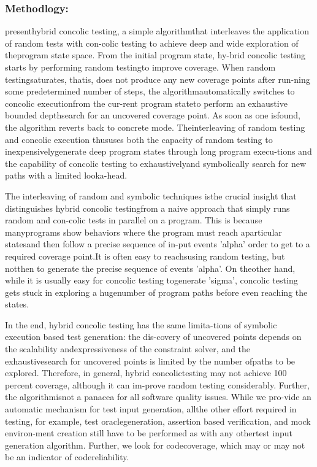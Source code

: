 \documentclass[	runningheads,
				a4paper]{llncs}
\begin{document}
\subsubsection{Methodlogy:}
presenthybrid concolic testing, a simple algorithmthat  interleaves  the  application  of  random  tests  with  con-colic  testing  to  achieve  deep  and  wide  exploration  of  theprogram  state  space.   From  the  initial  program  state,  hy-brid  concolic  testing  starts  by  performing  random  testingto improve coverage.  When random testingsaturates, thatis,  does  not  produce  any  new  coverage  points  after  run-ning  some  predetermined  number  of  steps,  the  algorithmautomatically switches to concolic executionfrom the cur-rent program stateto perform an exhaustive bounded depthsearch for an uncovered coverage point.  As soon as one isfound,  the algorithm reverts back to concrete mode.   Theinterleaving of random testing and concolic execution thususes both the capacity of random testing to inexpensivelygenerate deep program states through long program execu-tions and the capability of concolic testing to exhaustivelyand symbolically search for new paths with a limited looka-head.

The interleaving of random and symbolic techniques isthe crucial insight that distinguishes hybrid concolic testingfrom a naive approach that simply runs random and con-colic tests in parallel on a program.  This is because manyprograms show behaviors where the program must reach aparticular statesand then follow a precise sequence of in-put events 'alpha' order to get to a required coverage point.It  is  often  easy  to  reachsusing  random  testing,  but  notthen to generate the precise sequence of events 'alpha'.  On theother hand, while it is usually easy for concolic testing togenerate 'sigma', concolic testing gets stuck in exploring a hugenumber of program paths before even reaching the states.

In the end, hybrid concolic testing has the same limita-tions of symbolic execution based test generation:  the dis-covery of uncovered points depends on the scalability andexpressiveness of the constraint solver, and the exhaustivesearch  for  uncovered  points  is  limited  by  the  number  ofpaths to be explored. Therefore, in general, hybrid concolictesting may not achieve 100 percent coverage, although it can im-prove random testing considerably. Further, the algorithmisnot a panacea for all software quality issues. While we pro-vide an automatic mechanism for test input generation, allthe other effort required in testing, for example, test oraclegeneration, assertion based verification, and mock environ-ment creation still have to be performed as with any othertest input generation algorithm.  Further, we look for codecoverage,  which may or may not be an indicator of codereliability.
\end{document}
